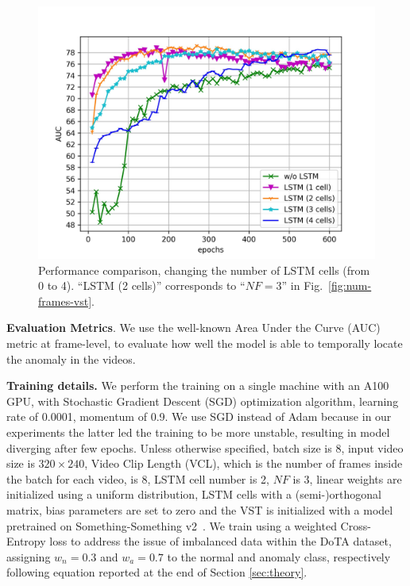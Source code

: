 \begin{figure}[t!]
\centerline{\includegraphics[clip,width=\figsize]{images/exp_2.jpg}}
	\caption{Performance comparison, changing the number of LSTM cells (from 0 to 4). ``LSTM (2 cells)'' corresponds to ``$\mathit{NF}=3$''  in Fig.~\ref{fig:num-frames-vst}.}
	\label{fig:num-memory-cells}
\end{figure}

\noindent\textbf{Evaluation Metrics}.
We use the well-known Area Under the Curve (AUC) metric at frame-level, to evaluate how well the model is able to temporally locate the anomaly in the videos.

\noindent\textbf{Training details.}
We perform the training on a single machine with an A100 GPU\@, with Stochastic Gradient Descent (SGD) optimization algorithm, learning rate of 0.0001, momentum of 0.9.
We use SGD instead of Adam because in our experiments the latter led the training to be more unstable, resulting in model diverging after few epochs.
Unless otherwise specified, batch size is 8, input video size is $320 \times 240$, Video Clip Length (VCL), which is the number of frames inside the batch for each video, is 8, LSTM cell number is 2, $\mathit{NF}$ is 3, linear weights are initialized using a uniform distribution, LSTM cells with a (semi-)orthogonal matrix, bias parameters are set to zero and the VST is initialized with a model pretrained on Something-Something v2~\cite{goyal2017something}.
We train using a weighted Cross-Entropy loss to address the issue of imbalanced data within the DoTA dataset, assigning $w_n=0.3$ and $w_a=0.7$ to the normal and anomaly class, respectively following equation reported at the end of Section \ref{sec:theory}.

